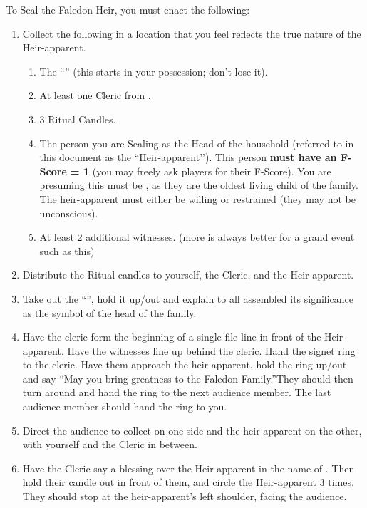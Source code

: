 \documentclass[green]{GL2020}
\begin{document}
To Seal the Faledon Heir, you must enact the following:
\begin{enumerate}
  \item Collect the following in a location that you feel reflects the true nature of the Heir-apparent.
    \begin{enumerate}
      \item The ``\iFaledonRing{}'' (this starts in your possession; don’t lose it).
      \item At least one Cleric from \cTech{}.
      \item 3 Ritual Candles.
      \item The person you are Sealing as the Head of the \cFaledonParent{\formal} household (referred to in this document as the ``Heir-apparent’’). This person \textbf{must have an F-Score = 1} (you may freely ask players for their F-Score). You are presuming this must be \cHeir{}, as they are the oldest living child of the \cFaledonParent{\formal} family. The heir-apparent must either be willing or restrained (they may not be unconscious).
      \item At least 2 additional witnesses. (more is always better for a grand event such as this)
    \end{enumerate}
  \item Distribute the Ritual candles to yourself, the Cleric, and the Heir-apparent.
  \item Take out the ``\iFaledonRing{}'', hold it up/out and explain to all assembled its significance as the symbol of the head of the \cFaledonParent{\formal} family.
  \item Have the cleric form the beginning of a single file line in front of the Heir-apparent. Have the witnesses line up behind the cleric. Hand the signet ring to the cleric. Have them approach the heir-apparent, hold the ring up/out and say ``May you bring greatness to the Faledon Family.''They should then turn around and hand the ring to the next audience member. The last audience member should hand the ring to you.
  \item Direct the audience to collect on one side and the heir-apparent on the other, with yourself and the Cleric in between.
  \item Have the Cleric say a blessing over the Heir-apparent in the name of \cTechGod{}. Then hold their candle out in front of them, and circle the Heir-apparent 3 times. They should stop at the heir-apparent’s left shoulder, facing the audience.
    \begin{enumerate}

\end{enumerate}
\end{enumerate}
\end{document}
